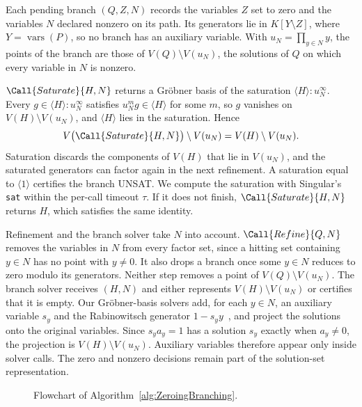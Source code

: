 Each pending branch $(Q,Z,N)$ records the variables $Z$ set to zero and the
variables $N$ declared nonzero on its path. Its generators lie in
$K[Y\setminus Z]$, where $Y=\operatorname{vars}(P)$, so no branch has an
auxiliary variable. With $u_N=\prod_{y\in N}y$, the points of the branch are
those of $V(Q)\setminus V(u_N)$, the solutions of $Q$ on which every variable
in $N$ is nonzero.

$\Call{Saturate}{H,N}$ returns a Gr\"obner basis of the saturation
$\langle H\rangle:u_N^\infty$. Every $g\in\langle H\rangle:u_N^\infty$
satisfies $u_N^mg\in\langle H\rangle$ for some $m$, so $g$ vanishes on
$V(H)\setminus V(u_N)$, and $\langle H\rangle$ lies in the saturation. Hence
\[
  V\bigl(\Call{Saturate}{H,N}\bigr)\setminus V(u_N)=V(H)\setminus V(u_N).
\]
Saturation discards the components of $V(H)$ that lie in $V(u_N)$, and the
saturated generators can factor again in the next refinement. A saturation
equal to $\langle1\rangle$ certifies the branch UNSAT. We compute the
saturation with Singular's \texttt{sat} within the per-call timeout $\tau$. If
it does not finish, $\Call{Saturate}{H,N}$ returns $H$, which satisfies the
same identity.

Refinement and the branch solver take $N$ into account.
$\Call{Refine}{Q,N}$ removes the variables in $N$ from every factor set, since
a hitting set containing $y\in N$ has no point with $y\neq0$. It also drops a
branch once some $y\in N$ reduces to zero modulo its generators. Neither step
removes a point of $V(Q)\setminus V(u_N)$. The branch solver receives $(H,N)$
and either represents $V(H)\setminus V(u_N)$ or certifies that it is empty.
Our Gr\"obner-basis solvers add, for each $y\in N$, an auxiliary variable
$s_y$ and the Rabinowitsch generator
$1-s_y y$~\cite{rabinowitsch1930nullstellensatz}, and project the solutions
onto the original variables. Since $s_ya_y=1$ has a solution $s_y$ exactly
when $a_y\neq0$, the projection is $V(H)\setminus V(u_N)$. Auxiliary
variables therefore appear only inside solver calls. The zero and
nonzero decisions
remain part of the solution-set representation.

\begin{figure}[pos=htbp]
  \centering
  \resizebox{0.72\textwidth}{!}{}
  \caption{Flowchart of Algorithm~\ref{alg:ZeroingBranching}.}
  \label{fig:variable_zeroing_flowchart}
\end{figure}

